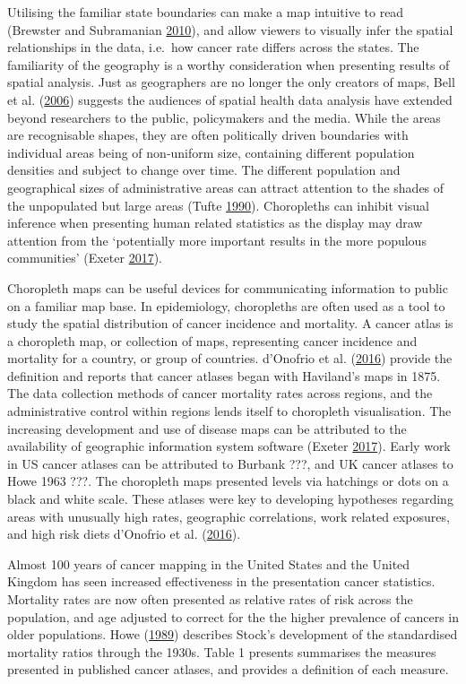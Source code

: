 \documentclass[11pt,]{article}
\begin{document}
Utilising the familiar state boundaries can make a map intuitive to read
(Brewster and Subramanian \protect\hyperlink{ref-CIBMUK}{2010}), and
allow viewers to visually infer the spatial relationships in the data,
i.e.~how cancer rate differs across the states. The familiarity of the
geography is a worthy consideration when presenting results of spatial
analysis. Just as geographers are no longer the only creators of maps,
Bell et al. (\protect\hyperlink{ref-CPISACA}{2006}) suggests the
audiences of spatial health data analysis have extended beyond
researchers to the public, policymakers and the media. While the areas
are recognisable shapes, they are often politically driven boundaries
with individual areas being of non-uniform size, containing different
population densities and subject to change over time. The different
population and geographical sizes of administrative areas can attract
attention to the shades of the unpopulated but large areas (Tufte
\protect\hyperlink{ref-EI}{1990}). Choropleths can inhibit visual
inference when presenting human related statistics as the display may
draw attention from the `potentially more important results in the more
populous communities' (Exeter \protect\hyperlink{ref-SE}{2017}).

Choropleth maps can be useful devices for communicating information to
public on a familiar map base. In epidemiology, choropleths are often
used as a tool to study the spatial distribution of cancer incidence and
mortality. A cancer atlas is a choropleth map, or collection of maps,
representing cancer incidence and mortality for a country, or group of
countries. d'Onofrio et al. (\protect\hyperlink{ref-MACM}{2016}) provide
the definition and reports that cancer atlases began with Haviland's
maps in 1875. The data collection methods of cancer mortality rates
across regions, and the administrative control within regions lends
itself to choropleth visualisation. The increasing development and use
of disease maps can be attributed to the availability of geographic
information system software (Exeter \protect\hyperlink{ref-SE}{2017}).
Early work in US cancer atlases can be attributed to Burbank ???, and UK
cancer atlases to Howe 1963 ???. The choropleth maps presented levels
via hatchings or dots on a black and white scale. These atlases were key
to developing hypotheses regarding areas with unusually high rates,
geographic correlations, work related exposures, and high risk diets
d'Onofrio et al. (\protect\hyperlink{ref-MACM}{2016}).

Almost 100 years of cancer mapping in the United States and the United
Kingdom has seen increased effectiveness in the presentation cancer
statistics. Mortality rates are now often presented as relative rates of
risk across the population, and age adjusted to correct for the the
higher prevalence of cancers in older populations. Howe
(\protect\hyperlink{ref-HEDP}{1989}) describes Stock's development of
the standardised mortality ratios through the 1930s. Table 1 presents
summarises the measures presented in published cancer atlases, and
provides a definition of each measure.
\end{document}
